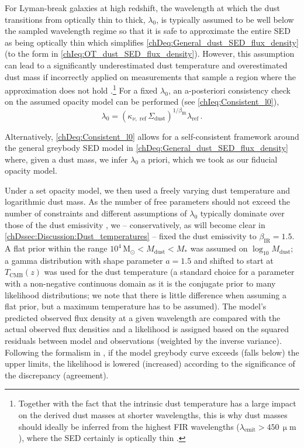 For Lyman-break galaxies at high redshift, the wavelength at which the dust transitions from optically thin to thick, $\lambda_0$, is typically assumed to be well below the sampled wavelength regime so that it is safe to approximate the entire SED as being optically thin \citep[$\tau (\nu) \ll 1$; e.g.][]{2021MNRAS.508L..58B} which simplifies \cref{chDeq:General_dust_SED_flux_density} (to the form in \cref{chIeq:OT_dust_SED_flux_density}). However, this assumption can lead to a significantly underestimated dust temperature and overestimated dust mass if incorrectly applied on measurements that sample a region where the approximation does not hold \citep{2020A&A...634L..14C, 2020MNRAS.498.4109J}.\footnote{Together with the fact that the intrinsic dust temperature has a large impact on the derived dust masses at shorter wavelengths, this is why dust masses should ideally be inferred from the highest FIR wavelengths ($\lambda_\text{emit} > 450 \, \mathrm{\upmu m}$), where the SED certainly is optically thin \citep{2012MNRAS.425.3094C}.} For a fixed $\lambda_0$, an a-posteriori consistency check on the assumed opacity model can be performed (see \cref{chIeq:Consistent_l0}),
\begin{equation}
    \label{chDeq:Consistent_l0}
    \lambda_0 = \left( \kappa_{\nu, \text{ ref}} \, \Sigma_\text{dust} \right)^{1/\beta_\text{IR}} \lambda_\text{ref} \, .
\end{equation}

Alternatively, \cref{chDeq:Consistent_l0} allows for a self-consistent framework around the general greybody SED model in \cref{chDeq:General_dust_SED_flux_density} where, given a dust mass, we infer $\lambda_0$ a priori, which we took as our fiducial opacity model.

Under a set opacity model, we then used a freely varying dust temperature and logarithmic dust mass. As the number of free parameters should not exceed the number of constraints and different assumptions of $\lambda_0$ typically dominate over those of the dust emissivity \citep{2014PhR...541...45C}, we -- conservatively, as will become clear in \cref{chDssec:Discussion:Dust_temperatures} -- fixed the dust emissivity to $\beta_\text{IR} = 1.5$. A flat prior within the range $10^4 \, \mathrm{M_\odot} < M_\text{dust} < M_*$ was assumed on $\log_{10} M_\text{dust}$; a gamma distribution with shape parameter $a = 1.5$ and shifted to start at $T_\text{CMB}(z)$ was used for the dust temperature (a standard choice for a parameter with a non-negative continuous domain as it is the conjugate prior to many likelihood distributions; we note that there is little difference when assuming a flat prior, but a maximum temperature has to be assumed). The model's predicted observed flux density at a given wavelength are compared with the actual observed flux densities and a likelihood is assigned based on the squared residuals between model and observations (weighted by the inverse variance). Following the formalism in \citet{2012PASP..124.1208S}, if the model greybody curve exceeds (falls below) the upper limits, the likelihood is lowered (increased) according to the significance of the discrepancy (agreement).

